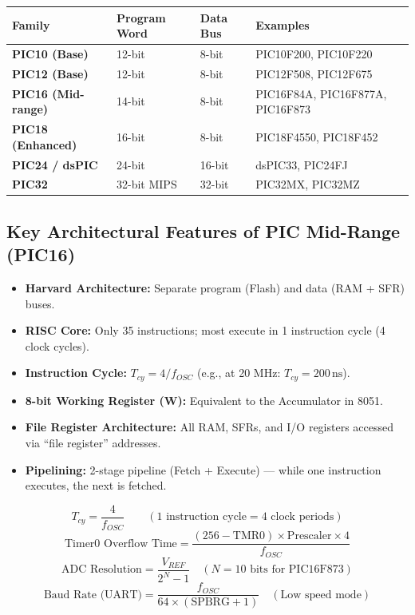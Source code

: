 \documentclass[12pt,a4paper]{article}
\renewcommand{\arraystretch}{1.45}
\begin{document}
\par\noindent
{\renewcommand{\arraystretch}{1.6}%
\begin{tabularx}{\linewidth}{|B{3.0cm}|Y|Y|Y|}
\hline
\textbf{Family} & \textbf{Program Word} & \textbf{Data Bus} & \textbf{Examples} \\
\hline
\textbf{PIC10 (Base)} & 12-bit & 8-bit & PIC10F200, PIC10F220 \\
\hline
\textbf{PIC12 (Base)} & 12-bit & 8-bit & PIC12F508, PIC12F675 \\
\hline
\textbf{PIC16 (Mid-range)} & 14-bit & 8-bit & PIC16F84A, PIC16F877A, PIC16F873 \\
\hline
\textbf{PIC18 (Enhanced)} & 16-bit & 8-bit & PIC18F4550, PIC18F452 \\
\hline
\textbf{PIC24 / dsPIC} & 24-bit & 16-bit & dsPIC33, PIC24FJ \\
\hline
\textbf{PIC32} & 32-bit MIPS & 32-bit & PIC32MX, PIC32MZ \\
\hline
\end{tabularx}}

\subsection{Key Architectural Features of PIC Mid-Range (PIC16)}
\begin{itemize}[leftmargin=*, itemsep=3pt]
  \item \textbf{Harvard Architecture:} Separate program (Flash) and data (RAM + SFR) buses.
  \item \textbf{RISC Core:} Only 35 instructions; most execute in 1 instruction cycle (4 clock cycles).
  \item \textbf{Instruction Cycle:} $T_{cy} = 4 / f_{OSC}$ (e.g., at 20 MHz: $T_{cy} = 200\,\text{ns}$).
  \item \textbf{8-bit Working Register (W):} Equivalent to the Accumulator in 8051.
  \item \textbf{File Register Architecture:} All RAM, SFRs, and I/O registers accessed via ``file register'' addresses.
  \item \textbf{Pipelining:} 2-stage pipeline (Fetch + Execute) --- while one instruction executes, the next is fetched.
\end{itemize}

\begin{tcolorbox}[formulabox, title={\textbf{PIC16 Key Formulas}}]
\[
T_{cy} = \frac{4}{f_{OSC}} \qquad (\text{1 instruction cycle} = 4 \text{ clock periods})
\]
\[
\text{Timer0 Overflow Time} = \frac{(256 - \text{TMR0}) \times \text{Prescaler} \times 4}{f_{OSC}}
\]
\[
\text{ADC Resolution} = \frac{V_{REF}}{2^N - 1} \quad (N = 10\text{ bits for PIC16F873})
\]
\[
\text{Baud Rate (UART)} = \frac{f_{OSC}}{64 \times (\text{SPBRG} + 1)} \quad (\text{Low speed mode})
\]
\end{tcolorbox}
\end{document}
